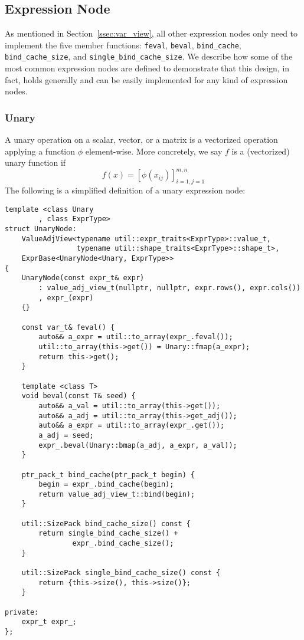 \subsection{Expression Node}

As mentioned in Section~\ref{ssec:var_view},
all other expression nodes only need to
implement the five member functions: \verb|feval|, \verb|beval|,
\verb|bind_cache|, \verb|bind_cache_size|, and \verb|single_bind_cache_size|.
We describe how some of the most common expression nodes are defined
to demonstrate that this design, in fact, holds generally and 
can be easily implemented for any kind of expression nodes.

\subsubsection{Unary}

A unary operation on a scalar, vector, or a matrix is a vectorized 
operation applying a function $\phi$ element-wise.
More concretely, we say $f$ is a (vectorized) unary function if
\[
    f(x) = {[\phi(x_{ij})]}_{i=1,j=1}^{m,n}
\]
The following is a simplified definition of a unary expression node:
\begin{lstlisting}[style=customcpp]
template <class Unary
        , class ExprType>
struct UnaryNode:
    ValueAdjView<typename util::expr_traits<ExprType>::value_t,
                 typename util::shape_traits<ExprType>::shape_t>,
    ExprBase<UnaryNode<Unary, ExprType>>
{
    UnaryNode(const expr_t& expr)
        : value_adj_view_t(nullptr, nullptr, expr.rows(), expr.cols())
        , expr_(expr)
    {}

    const var_t& feval() {
        auto&& a_expr = util::to_array(expr_.feval());
        util::to_array(this->get()) = Unary::fmap(a_expr);
        return this->get();
    }

    template <class T>
    void beval(const T& seed) {
        auto&& a_val = util::to_array(this->get());
        auto&& a_adj = util::to_array(this->get_adj());
        auto&& a_expr = util::to_array(expr_.get());
        a_adj = seed;
        expr_.beval(Unary::bmap(a_adj, a_expr, a_val));
    }

    ptr_pack_t bind_cache(ptr_pack_t begin) { 
        begin = expr_.bind_cache(begin);
        return value_adj_view_t::bind(begin);
    }

    util::SizePack bind_cache_size() const { 
        return single_bind_cache_size() + 
                expr_.bind_cache_size();
    }

    util::SizePack single_bind_cache_size() const {
        return {this->size(), this->size()};
    }

private:
    expr_t expr_;
};
\end{lstlisting}

